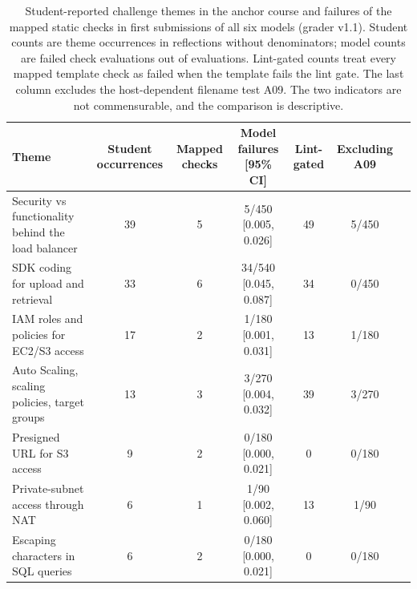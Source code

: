 \begin{table}[t]
\caption{Student-reported challenge themes in the anchor course and failures of the mapped static checks in first submissions of all six models (grader v1.1). Student counts are theme occurrences in reflections without denominators; model counts are failed check evaluations out of evaluations. Lint-gated counts treat every mapped template check as failed when the template fails the lint gate. The last column excludes the host-dependent filename test A09. The two indicators are not commensurable, and the comparison is descriptive.}
\label{tab:themes}
\footnotesize
\setlength{\tabcolsep}{3.5pt}
\begin{tabular}{p{5.2cm}cccccc}
\toprule
Theme & Student occurrences & Mapped checks & Model failures [95\% CI] & Lint-gated & Excluding A09\\
\midrule
Security vs functionality behind the load balancer & 39 & 5 & 5/450 {\scriptsize[0.005, 0.026]} & 49 & 5/450\\
SDK coding for upload and retrieval & 33 & 6 & 34/540 {\scriptsize[0.045, 0.087]} & 34 & 0/450\\
IAM roles and policies for EC2/S3 access & 17 & 2 & 1/180 {\scriptsize[0.001, 0.031]} & 13 & 1/180\\
Auto Scaling, scaling policies, target groups & 13 & 3 & 3/270 {\scriptsize[0.004, 0.032]} & 39 & 3/270\\
Presigned URL for S3 access & 9 & 2 & 0/180 {\scriptsize[0.000, 0.021]} & 0 & 0/180\\
Private-subnet access through NAT & 6 & 1 & 1/90 {\scriptsize[0.002, 0.060]} & 13 & 1/90\\
Escaping characters in SQL queries & 6 & 2 & 0/180 {\scriptsize[0.000, 0.021]} & 0 & 0/180\\
\bottomrule
\end{tabular}
\end{table}
